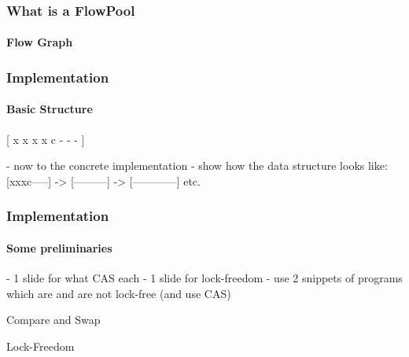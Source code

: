 \documentclass{beamer}
\begin{document}
\begin{frame}
  \frametitle{What is a FlowPool}
  \framesubtitle{Flow Graph}

  \centering

\end{frame}

\begin{frame}
  \frametitle{Implementation}
  \framesubtitle{Basic Structure}

  { \Huge [  x x x x c - - - ] }

- now to the concrete implementation - show how the data structure looks like: [xxxc-----] -> [---------] -> [------------] etc.

\end{frame}

\begin{frame}
  \frametitle{Implementation}
  \framesubtitle{Some preliminaries}

- 1 slide for what CAS each
- 1 slide for lock-freedom - use 2 snippets of programs which are and are not lock-free (and use CAS)


  \begin{block}{Compare and Swap}

  \end{block}

  \begin{block}{Lock-Freedom}

  \end{block}

\end{frame}
\end{document}
